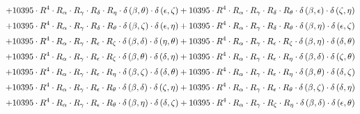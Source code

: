 \begin{subequations}
\begin{gather}
 \\[0.2em] \notag 		 + 10395 \cdot R^{4} \cdot R_{\alpha{}} \cdot R_{\gamma{}} \cdot R_{\delta{}} \cdot R_{\eta{}} \cdot \delta{}\left(\beta{}, \theta{}\right) \cdot \delta{}\left(\epsilon{}, \zeta{}\right)+ 10395 \cdot R^{4} \cdot R_{\alpha{}} \cdot R_{\gamma{}} \cdot R_{\delta{}} \cdot R_{\theta{}} \cdot \delta{}\left(\beta{}, \epsilon{}\right) \cdot \delta{}\left(\zeta{}, \eta{}\right) 
 \\[0.2em] \notag 		 + 10395 \cdot R^{4} \cdot R_{\alpha{}} \cdot R_{\gamma{}} \cdot R_{\delta{}} \cdot R_{\theta{}} \cdot \delta{}\left(\beta{}, \zeta{}\right) \cdot \delta{}\left(\epsilon{}, \eta{}\right)+ 10395 \cdot R^{4} \cdot R_{\alpha{}} \cdot R_{\gamma{}} \cdot R_{\delta{}} \cdot R_{\theta{}} \cdot \delta{}\left(\beta{}, \eta{}\right) \cdot \delta{}\left(\epsilon{}, \zeta{}\right) 
 \\[0.2em] \notag 		 + 10395 \cdot R^{4} \cdot R_{\alpha{}} \cdot R_{\gamma{}} \cdot R_{\epsilon{}} \cdot R_{\zeta{}} \cdot \delta{}\left(\beta{}, \delta{}\right) \cdot \delta{}\left(\eta{}, \theta{}\right)+ 10395 \cdot R^{4} \cdot R_{\alpha{}} \cdot R_{\gamma{}} \cdot R_{\epsilon{}} \cdot R_{\zeta{}} \cdot \delta{}\left(\beta{}, \eta{}\right) \cdot \delta{}\left(\delta{}, \theta{}\right) 
 \\[0.2em] \notag 		 + 10395 \cdot R^{4} \cdot R_{\alpha{}} \cdot R_{\gamma{}} \cdot R_{\epsilon{}} \cdot R_{\zeta{}} \cdot \delta{}\left(\beta{}, \theta{}\right) \cdot \delta{}\left(\delta{}, \eta{}\right)+ 10395 \cdot R^{4} \cdot R_{\alpha{}} \cdot R_{\gamma{}} \cdot R_{\epsilon{}} \cdot R_{\eta{}} \cdot \delta{}\left(\beta{}, \delta{}\right) \cdot \delta{}\left(\zeta{}, \theta{}\right) 
 \\[0.2em] \notag 		 + 10395 \cdot R^{4} \cdot R_{\alpha{}} \cdot R_{\gamma{}} \cdot R_{\epsilon{}} \cdot R_{\eta{}} \cdot \delta{}\left(\beta{}, \zeta{}\right) \cdot \delta{}\left(\delta{}, \theta{}\right)+ 10395 \cdot R^{4} \cdot R_{\alpha{}} \cdot R_{\gamma{}} \cdot R_{\epsilon{}} \cdot R_{\eta{}} \cdot \delta{}\left(\beta{}, \theta{}\right) \cdot \delta{}\left(\delta{}, \zeta{}\right) 
 \\[0.2em] \notag 		 + 10395 \cdot R^{4} \cdot R_{\alpha{}} \cdot R_{\gamma{}} \cdot R_{\epsilon{}} \cdot R_{\theta{}} \cdot \delta{}\left(\beta{}, \delta{}\right) \cdot \delta{}\left(\zeta{}, \eta{}\right)+ 10395 \cdot R^{4} \cdot R_{\alpha{}} \cdot R_{\gamma{}} \cdot R_{\epsilon{}} \cdot R_{\theta{}} \cdot \delta{}\left(\beta{}, \zeta{}\right) \cdot \delta{}\left(\delta{}, \eta{}\right) 
 \\[0.2em] \notag 		 + 10395 \cdot R^{4} \cdot R_{\alpha{}} \cdot R_{\gamma{}} \cdot R_{\epsilon{}} \cdot R_{\theta{}} \cdot \delta{}\left(\beta{}, \eta{}\right) \cdot \delta{}\left(\delta{}, \zeta{}\right)+ 10395 \cdot R^{4} \cdot R_{\alpha{}} \cdot R_{\gamma{}} \cdot R_{\zeta{}} \cdot R_{\eta{}} \cdot \delta{}\left(\beta{}, \delta{}\right) \cdot \delta{}\left(\epsilon{}, \theta{}\right) 

\end{gather}
\end{subequations}
